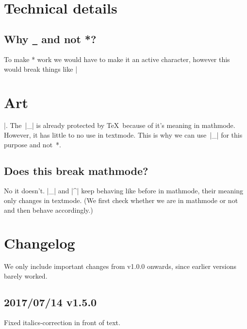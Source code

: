 \documentclass[11pt, cm-default]{l3doc}
\begin{document}



	\section{Technical details}
	\subsection{Why \texttt{\_} and not *?\label{Why?!}}
	To make * work we would have to make it an active character, however this would
	break things like |\section*{Art}|. The~|_| is already protected by \TeX\ because
	of it's meaning in mathmode. However, it has little to no use in textmode. This
	is why we can use~|_| for this purpose and not~*.
	
	\subsection{Does this break mathmode?}
	No it doesn't. |_| and |^| keep behaving like before in mathmode, their meaning
	only changes in textmode. (We first check whether we are in mathmode or not and
	then behave accordingly.)


	\section{Changelog}
	We only include important changes from v1.0.0 onwards, since earlier versions
	barely worked.

	\subsection*{2017/07/14 v1.5.0}
	Fixed italics-correction in front of text.
\end{document}
